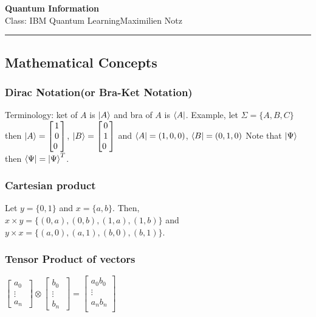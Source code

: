 \documentclass[5pt]{article}
\begin{document}
\begin{center}
     \Large{\textbf{Quantum Information}}\\
     \small{Class: IBM Quantum Learning}\hfill\small{\textcopyright Maximilien Notz \the\year{}}
     \noindent\rule{20.2cm}{0.4pt}
\end{center}


\begin{multicols}{3}
\setcounter{secnumdepth}{0}

\subsection{Mathematical Concepts}

\subsubsection{Dirac Notation\footnotesize{(or Bra-Ket Notation)}}
Terminology: ket of $A$ is $\ket{A}$ and bra of $A$ is $\bra{A}$.
Example, let $\Sigma=\{A,B,C\}$ then $\ket{A}=\begin{bmatrix}1\\0\\0\ \end{bmatrix}$, $\ket{B}=\begin{bmatrix}0\\1\\0\ \end{bmatrix}$
and $\bra{A}=(1,0,0)$, $\bra{B}=(0,1,0)$
Note that $\ket{\Psi}$ then $\bra{\Psi}=\ket{\Psi}^T$.

\subsubsection{Cartesian product}
Let $y=\{0,1\}$ and  $x=\{a,b\}$. Then, \\
$x\times y = \{(0,a),(0,b),(1,a),(1,b)\}$ and \\
$y\times x = \{(a,0),(a,1),(b,0),(b,1)\}$.

\subsubsection{Tensor Product of vectors}
$\begin{bmatrix}a_0\\ \vdots\\a_n\ \end{bmatrix}\otimes\begin{bmatrix}b_0\\ \vdots\\b_n\ \end{bmatrix}= \begin{bmatrix}a_0b_0\\ \vdots\\a_nb_n\\ \end{bmatrix}$



\end{multicols}
\end{document}
